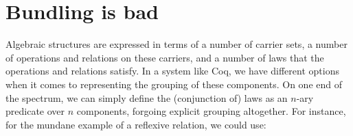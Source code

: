 \documentclass[a4paper,10pt,runningheads]{llncs}
\begin{document}
% 

\section{Bundling is bad}\label{bundling}

Algebraic structures are expressed in terms of a number of carrier sets, a number of operations and relations on these carriers, and a number of laws that the operations and relations satisfy. In a system like Coq, we have different options when it comes to representing the grouping of these components. On one end of the spectrum, we can simply define the (conjunction of) laws as an $n$-ary predicate over $n$ components, forgoing explicit grouping altogether. For instance, for the mundane example of a reflexive relation, we could use:
\end{document}
